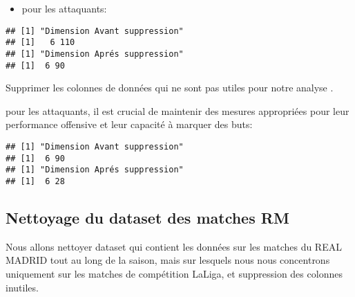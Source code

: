 \documentclass[
  6pt,
]{article}
\providecommand{\tightlist}{%
  \setlength{\itemsep}{0pt}\setlength{\parskip}{0pt}}
\begin{document}
\begin{itemize}
\tightlist
\item
  pour les attaquants:
\end{itemize}

\begin{verbatim}
## [1] "Dimension Avant suppression"
## [1]   6 110
## [1] "Dimension Aprés suppression"
## [1]  6 90
\end{verbatim}

Supprimer les colonnes de données qui ne sont pas utiles pour notre
analyse .

pour les attaquants, il est crucial de maintenir des mesures appropriées
pour leur performance offensive et leur capacité à marquer des buts:

\begin{verbatim}
## [1] "Dimension Avant suppression"
## [1]  6 90
## [1] "Dimension Aprés suppression"
## [1]  6 28
\end{verbatim}

\subsection{Nettoyage du dataset des matches
RM}\label{nettoyage-du-dataset-des-matches-rm}

Nous allons nettoyer dataset qui contient les données sur les matches du
REAL MADRID tout au long de la saison, mais sur lesquels nous nous
concentrons uniquement sur les matches de compétition LaLiga, et
suppression des colonnes inutiles.
\end{document}
